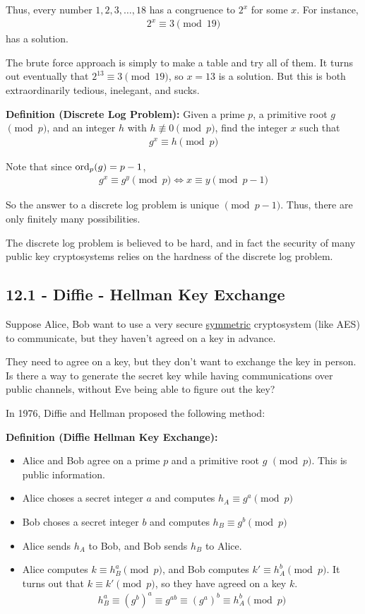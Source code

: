 \documentclass{article}
\begin{document}
Thus, every number $1,2,3,\dots,18$ has a congruence to $2^x$ for some $x$. For instance, \begin{align*}
    2^x\equiv 3\pmod{19}
\end{align*}has a solution. 

The brute force approach is simply to make a table and try all of them. It turns out eventually that $2^{13}\equiv 3\pmod{19}$, so $x=13$ is a solution. But this is both extraordinarily tedious, inelegant, and sucks. 

\textbf{Definition (Discrete Log Problem):} Given a prime $p$, a primitive root $g$ $\pmod p$, and an integer $h$ with $h\not\equiv 0\pmod p$, find the integer $x$ such that \begin{align*}
    g^x\equiv h\pmod p
\end{align*}

Note that since $\text{ord}_p(g)=p-1$, \begin{align*}
    g^x\equiv g^y\pmod p\iff x\equiv y\pmod{p-1}
\end{align*}

So the answer to a discrete log problem is unique $\pmod{p-1}$. Thus, there are only finitely many possibilities. 

The discrete log problem is believed to be hard, and in fact the security of many public key cryptosystems relies on the hardness of the discrete log problem.

\subsection{12.1 - Diffie - Hellman Key Exchange}

Suppose Alice, Bob want to use a very secure \underline{symmetric} cryptosystem (like AES) to communicate, but they haven't agreed on a key in advance.

They need to agree on a key, but they don't want to exchange the key in person. Is there a way to generate the secret key while having communications over public channels, without Eve being able to figure out the key?

In 1976, Diffie and Hellman proposed the following method: 

\textbf{Definition (Diffie Hellman Key Exchange):} \begin{itemize}
    \item Alice and Bob agree on a prime $p$ and a primitive root $g$ $\pmod p$. This is public information.
    \item Alice choses a secret integer $a$ and computes $h_A\equiv g^a\pmod p$
    \item Bob choses a secret integer $b$ and computes $h_B\equiv g^b\pmod p$
    \item Alice sends $h_A$ to Bob, and Bob sends $h_B$ to Alice.
    \item Alice computes $k\equiv h_B^a\pmod p$, and Bob computes $k'\equiv h_A^b\pmod p$. It turns out that $k\equiv k'\pmod p$, so they have agreed on a key $k$. \begin{align*}
        h_B^a\equiv (g^b)^a\equiv g^{ab}\equiv (g^a)^b\equiv h_A^b\pmod p
    \end{align*}
\end{itemize}
\end{document}
